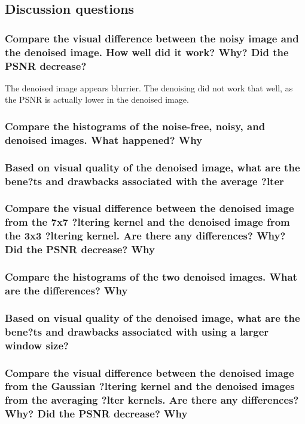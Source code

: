 \documentclass[article, 1.5space, letterpaper, 12pt, oneside, header, footer]{SydeClass}
\begin{document}
\clearpage


\subsection{Discussion questions}

\subsubsection{Compare the visual difference between the noisy image and the denoised image. How well did it
work? Why? Did the PSNR decrease?}
The denoised image appears blurrier. The denoising did not work that well, as the PSNR is actually lower in the denoised image.

\subsubsection{Compare the histograms of the noise-free, noisy, and denoised images. What happened? Why}


\subsubsection{Based on visual quality of the denoised image, what are the bene?ts and drawbacks associated with
the average ?lter}

\subsubsection{Compare the visual difference between the denoised image from the 7x7 ?ltering kernel and the
denoised image from the 3x3 ?ltering kernel. Are there any differences? Why? Did the PSNR
decrease? Why}

\subsubsection{Compare the histograms of the two denoised images. What are the differences? Why}


\subsubsection{Based on visual quality of the denoised image, what are the bene?ts and drawbacks associated with
using a larger window size?}


\subsubsection{Compare the visual difference between the denoised image from the Gaussian ?ltering kernel and the
denoised images from the averaging ?lter kernels. Are there any differences? Why? Did the PSNR
decrease? Why}
\end{document}
